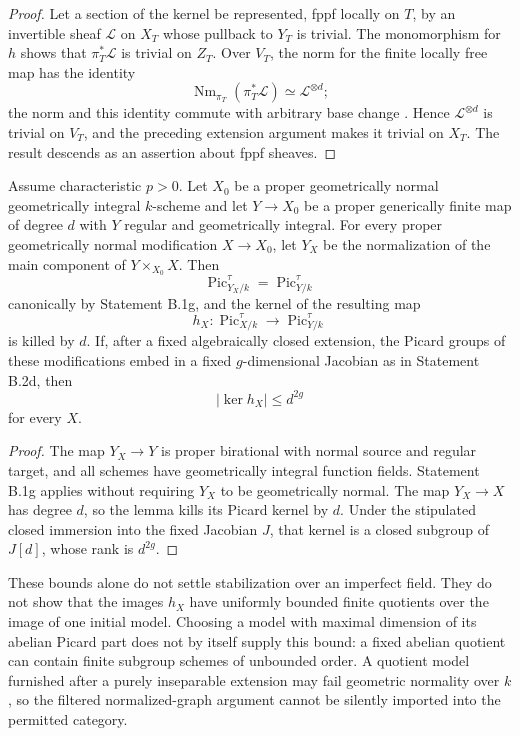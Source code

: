 \begin{proof}
Let a section of the kernel be represented, fppf locally on $T$,
by an invertible sheaf $\mathcal L$ on $X_T$ whose pullback to
$Y_T$ is trivial.  The monomorphism for $h$ shows that
$\pi_T^*\mathcal L$ is trivial on $Z_T$.  Over $V_T$, the norm
for the finite locally free map has the identity
\[
 \operatorname{Nm}_{\pi_T}(\pi_T^*\mathcal L)
       \simeq\mathcal L^{\otimes d};
\]
the norm and this identity commute with arbitrary base change
\cite[Lemmas 31.18.2 and 31.18.6, Tags 0BCY and 0BD2]
{C_StacksPicNorm}.  Hence $\mathcal L^{\otimes d}$ is trivial on
$V_T$, and the preceding extension argument makes it trivial on
$X_T$.  The result descends as an assertion about fppf sheaves.
\end{proof}

\begin{corollary}
\label{C:B2-fixed-alteration-kernel}
Assume characteristic $p>0$.  Let $X_0$ be a proper geometrically
normal geometrically integral $k$-scheme and let $Y\to X_0$ be a
proper generically finite map of degree $d$ with $Y$ regular and
geometrically integral.  For every proper geometrically normal
modification $X\to X_0$, let $Y_X$ be the normalization of the
main component of $Y\times_{X_0}X$.  Then
\[
 \operatorname{Pic}^{\tau}_{Y_X/k}
       =\operatorname{Pic}^{\tau}_{Y/k}
\]
canonically by Statement B.1g, and the kernel of the resulting map
\[
 h_X:\operatorname{Pic}^{\tau}_{X/k}\longrightarrow
             \operatorname{Pic}^{\tau}_{Y/k}
\]
is killed by $d$.  If, after a fixed algebraically closed extension,
the Picard groups of these modifications embed in a fixed
$g$-dimensional Jacobian as in Statement B.2d, then
\[
             |\ker h_X|\leq d^{2g}
\]
for every $X$.
\end{corollary}
\begin{proof}
The map $Y_X\to Y$ is proper birational with normal source and
regular target, and all schemes have geometrically integral
function fields.  Statement B.1g applies without requiring $Y_X$
to be geometrically normal.  The map $Y_X\to X$ has degree $d$,
so the lemma kills its Picard kernel by $d$.  Under the stipulated
closed immersion into the fixed Jacobian $J$, that kernel is a
closed subgroup of $J[d]$, whose rank is $d^{2g}$.
\end{proof}

\begin{remark}
These bounds alone do not settle stabilization over an imperfect
field.  They do not show that the images $h_X$ have uniformly
bounded finite quotients over the image of one initial model.
Choosing a model with maximal dimension of its abelian Picard part
does not by itself supply this bound: a fixed abelian quotient can
contain finite subgroup schemes of unbounded order.  A quotient
model furnished after a purely inseparable extension may fail
geometric normality over $k$, so the filtered normalized-graph
argument cannot be silently imported into the permitted category.
\end{remark}
